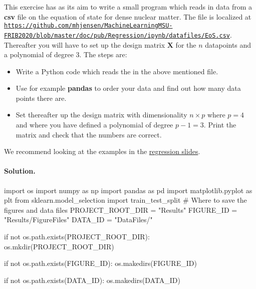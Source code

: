 \documentclass[%
oneside,                 %
final,                   %
10pt]{article}
\newenvironment{doconceexercise}{}{}
\newcounter{doconceexercisecounter}
\begin{document}
\begin{doconceexercise}

                             

This exercise has as its aim to write a small program which reads in data from a \textbf{csv} file on the equation of state for dense nuclear matter. The file is localized at \href{{https://github.com/mhjensen/MachineLearningMSU-FRIB2020/blob/master/doc/pub/Regression/ipynb/datafiles/EoS.csv}}{\nolinkurl{https://github.com/mhjensen/MachineLearningMSU-FRIB2020/blob/master/doc/pub/Regression/ipynb/datafiles/EoS.csv}}. Thereafter you will have to set up the design matrix $\bm{X}$ for the  $n$
datapoints and a polynomial of degree $3$. The steps are:
\begin{itemize}
\item Write a Python code which reads the in the above mentioned file.

\item Use for example \textbf{pandas} to order your data and find out how many data points there are.

\item Set thereafter up the design matrix with dimensionality $n\times p$ where $p=4$ and where you have defined a polynomial of degree $p-1=3$. Print the matrix and check that the numbers are correct. 
\end{itemize}

\noindent
We recommend looking at the examples in the \href{{https://compphysics.github.io/MachineLearning/doc/pub/Regression/html/Regression-bs.html}}{regression slides}.


\paragraph{Solution.}
\bpycod
import os
import numpy as np
import pandas as pd
import matplotlib.pyplot as plt
from sklearn.model_selection import train_test_split
# Where to save the figures and data files
PROJECT_ROOT_DIR = "Results"
FIGURE_ID = "Results/FigureFiles"
DATA_ID = "DataFiles/"

if not os.path.exists(PROJECT_ROOT_DIR):
    os.mkdir(PROJECT_ROOT_DIR)

if not os.path.exists(FIGURE_ID):
    os.makedirs(FIGURE_ID)

if not os.path.exists(DATA_ID):
    os.makedirs(DATA_ID)


\end{doconceexercise}
\end{document}
